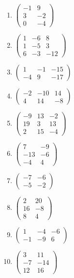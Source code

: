 \begin{enumerate}[label=\arabic*., leftmargin=*, itemsep=1pt]
\item $\left(\begin{smallmatrix}-1 & 9\\ 3 & -2\\ 0 & -4\end{smallmatrix}\right)$
\item $\left(\begin{smallmatrix}1 & -6 & 8\\ 1 & -5 & 3\\ 6 & -3 & -12\end{smallmatrix}\right)$
\item $\left(\begin{smallmatrix}1 & -1 & -15\\ -4 & 9 & -17\end{smallmatrix}\right)$
\item $\left(\begin{smallmatrix}-2 & -10 & 14\\ 4 & 14 & -8\end{smallmatrix}\right)$
\item $\left(\begin{smallmatrix}-9 & 13 & -2\\ 19 & 3 & 13\\ 2 & 15 & -4\end{smallmatrix}\right)$
\item $\left(\begin{smallmatrix}7 & -9\\ -13 & -6\\ -4 & 4\end{smallmatrix}\right)$
\item $\left(\begin{smallmatrix}-7 & -6\\ -5 & -2\end{smallmatrix}\right)$
\item $\left(\begin{smallmatrix}2 & 20\\ 16 & -8\\ 8 & 4\end{smallmatrix}\right)$
\item $\left(\begin{smallmatrix}1 & -4 & -6\\ -1 & -9 & 6\end{smallmatrix}\right)$
\item $\left(\begin{smallmatrix}3 & 11\\ -7 & -14\\ 12 & 16\end{smallmatrix}\right)$

\end{enumerate}
